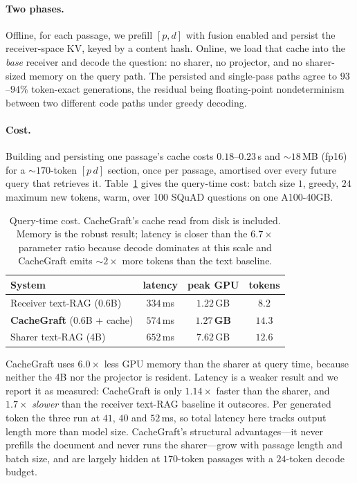 \documentclass[sigconf,anonymous,review]{acmart}
\newcommand{\sys}{CacheGraft}
\newcommand{\best}[1]{\textbf{#1}}
\begin{document}
\paragraph{Two phases.} Offline, for each passage, we prefill $[p,d]$ with fusion enabled and
persist the receiver-space KV, keyed by a content hash. Online, we load that cache into the
\emph{base} receiver and decode the question: no sharer, no projector, and no sharer-sized memory
on the query path. The persisted and single-pass paths agree to $93$--$94\%$ token-exact
generations, the residual being floating-point nondeterminism between two different code paths
under greedy decoding.

\paragraph{Cost.} Building and persisting one passage's cache costs $0.18$--$0.23$\,s and
${\sim}18$\,MB (fp16) for a ${\sim}170$-token $[p\,d]$ section, once per passage, amortised over
every future query that retrieves it. Table~\ref{tab:cost} gives the query-time cost: batch size
$1$, greedy, $24$ maximum new tokens, warm, over 100 SQuAD questions on one A100-40GB.

\begin{table}[t]
\centering\small
\caption{Query-time cost. \sys{}'s cache read from disk is included. Memory is the robust result;
latency is closer than the $6.7\times$ parameter ratio because decode dominates at this scale and
\sys{} emits ${\sim}2\times$ more tokens than the text baseline.}
\label{tab:cost}
\begin{tabular}{lccc}
\toprule
System & latency & peak GPU & tokens \\
\midrule
Receiver text-RAG (0.6B) & $334$\,ms & $1.22$\,GB & $8.2$ \\
\textbf{\sys{}} (0.6B + cache) & $574$\,ms & \best{$1.27$\,GB} & $14.3$ \\
Sharer text-RAG (4B) & $652$\,ms & $7.62$\,GB & $12.6$ \\
\bottomrule
\end{tabular}
\end{table}

\sys{} uses $6.0\times$ less GPU memory than the sharer at query time, because neither the 4B nor
the projector is resident. Latency is a weaker result and we report it as measured: \sys{} is only
$1.14\times$ faster than the sharer, and $1.7\times$ \emph{slower} than the receiver text-RAG
baseline it outscores. Per generated token the three run at $41$, $40$ and $52$\,ms, so total
latency here tracks output length more than model size. \sys{}'s structural advantages---it never
prefills the document and never runs the sharer---grow with passage length and batch size, and are
largely hidden at $170$-token passages with a $24$-token decode budget.
\end{document}
